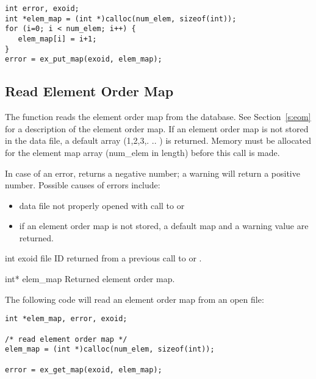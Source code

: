 \begin{lstlisting}
int error, exoid;
int *elem_map = (int *)calloc(num_elem, sizeof(int));
for (i=0; i < num_elem; i++) {
   elem_map[i] = i+1;
}
error = ex_put_map(exoid, elem_map);
\end{lstlisting}

\subsection{Read Element Order Map}

The function  reads the element order map from
the database. See Section~\ref{s:eom} for a description of the element
order map. If an element order map is not stored in the data file, a
default array (1,2,3,. .. ) is returned. Memory must be
allocated for the element map array ({num_elem} in length) before this
call is made.

In case of an error,  returns a negative number; a
warning will return a positive number. Possible causes of errors
include:
\begin{itemize}
 \item data file not properly opened with call to 
 or 

 \item if an element order map is not stored, a default map and a
 warning value are returned.
\end{itemize}


\begin{parameters}
\item[{int exoid \R{}}]
\exo{} file ID returned from a previous call to  or
.

\item[{int* elem_map \W{}}]
Returned element order map.
\end{parameters}

The following code will read an element order map from an
open \exo{} file:

\begin{lstlisting}
int *elem_map, error, exoid;

/* read element order map */
elem_map = (int *)calloc(num_elem, sizeof(int));

error = ex_get_map(exoid, elem_map);
\end{lstlisting}

